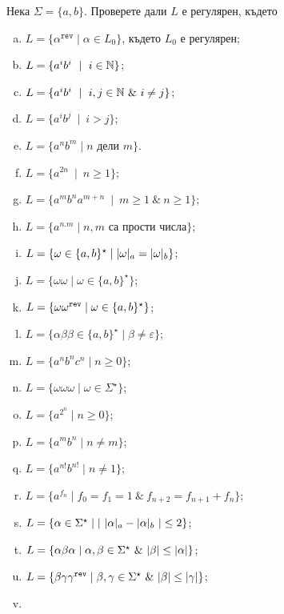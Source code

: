 \begin{problem}
  Нека $\Sigma = \{a,b\}$.  Проверете дали $L$ е регулярен, където
  \begin{enumerate}[a)]
  \item
    $L = \{\alpha^{\texttt{rev}} \mid \alpha \in L_0\}$, където $L_0$ е регулярен;
  \item
    $L = \{a^ib^i\ \mid\ i\in\Nat\}$;
  \item
    $L = \{a^ib^i\ \mid\ i,j\in\Nat\ \&\ i\neq j\}$;
  \item
    $L = \{a^ib^j\ \mid\ i > j\}$;
  \item
    $L = \{a^nb^m \mid n\mbox{ дели }m\}$.
  \item
    $L = \{a^{2n}\ \mid\ n\geq 1\}$;
  \item
    $L = \{a^mb^na^{m+n}\ \mid\ m\geq 1\ \&\ n\geq 1\}$;
  \item
    $L = \{a^{n.m}\mid n,m\mbox{ са прости числа}\}$;
  \item
    $L = \{\omega\in\{a,b\}^\star \mid \vert{\omega}\vert_{a} = \vert{\omega}\vert_{b}\}$;
  \item
    $L = \{\omega\omega\mid \omega\in\{a,b\}^\star\}$;
  \item
    $L = \{\omega\omega^{\texttt{rev}}\mid \omega\in\{a,b\}^\star\}$;
  \item
    $L = \{\alpha\beta\beta \in \{a,b\}^\star\mid \beta \neq \varepsilon\}$;
  \item
    $L = \{a^nb^nc^n\mid n\geq 0\}$;
  \item
    $L = \{\omega\omega\omega\mid \omega\in \Sigma^\star\}$;
  \item
    $L = \{a^{2^n}\mid n\geq 0\}$;
  \item
    $L = \{a^mb^n\mid n\neq m\}$;
  \item
    $L = \{a^{n!}b^{n!}\mid n\neq 1\}$;
  \item
    $L = \{a^{f_n} \mid f_0 = f_1 = 1\ \&\ f_{n+2} = f_{n+1} + f_{n}\}$;
  \item
    $L = \{\alpha \in \Sigma^\star \mid \vert{\ \vert{\alpha}\vert_{a} - \vert{\alpha}\vert_{b}\ }\vert \leq 2\}$;
  \item
    $L = \{\alpha\beta\alpha \mid \alpha,\beta \in \Sigma^\star\ \&\ \vert{\beta}\vert \leq \vert{\alpha}\vert\}$;
  \item
    $L = \{\beta\gamma\gamma^{\texttt{rev}}\mid \beta, \gamma \in \Sigma^\star\ \&\ \vert{\beta}\vert \leq \vert{\gamma}\vert\}$;
  \item

\end{enumerate}
\end{problem}
